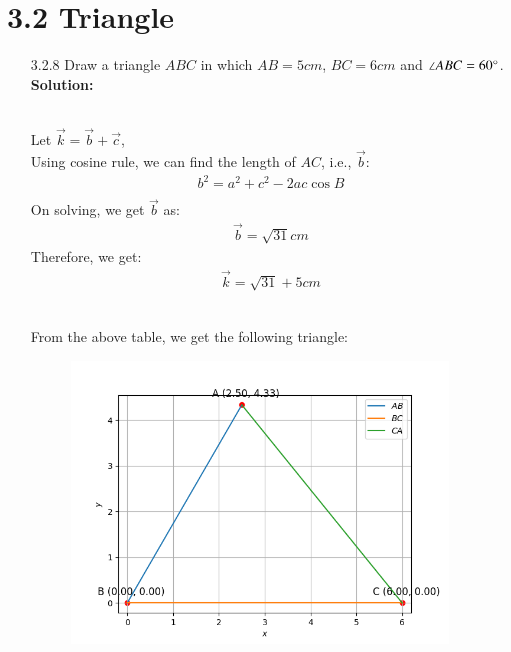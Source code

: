 \documentclass[journal]{IEEEtran}
\begin{document}
\section{3.2 Triangle}
\begin{enumerate}
\item [3.2.8] Draw a triangle $ABC$ in which $AB = 5cm$, $BC = 6cm$ and $\angle ABC = 60\degree$.\\
\textbf{Solution:}
\begin{table}[h!]
      \centering
      
      \caption{}
\end{table}\\
Let $\vec{k} = \vec{b} + \vec{c}$,\\
Using cosine rule, we can find the length of $AC$, i.e., $\vec{b}$:
\begin{align}
    b^2 = a^2 + c^2 - 2ac\cos{B}\\
\end{align}
On solving, we get $\vec{b}$ as:
\begin{align}
    \vec{b} = \sqrt{31}cm
\end{align}
Therefore, we get:
\begin{align}
    \vec{k} = \sqrt{31} + 5 cm
\end{align}
\begin{table}[h!]
      \centering
      
      \caption{}
\end{table}\\
From the above table, we get the following triangle:
\begin{figure}
    \centering
    \includegraphics[width=10cm]{figs/figure.png}
    \caption{}
    \label{fig:enter-label}
\end{figure}
\end{enumerate}
\end{document}
